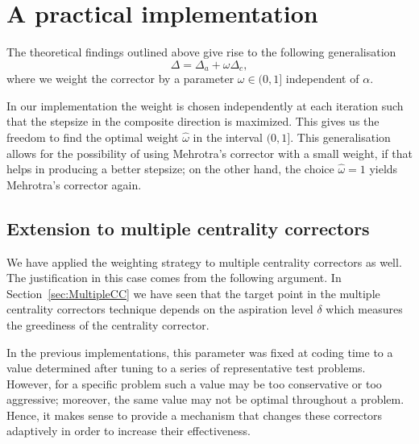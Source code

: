 

%
%
\section{A practical implementation}

The theoretical findings 
outlined above give rise to the following generalisation
\[
\Delta = \Delta_{a} +\omega\Delta_c,
\]
where we weight the corrector by a parameter $\omega\in(0,1]$ 
independent of $\alpha$.

In our implementation the weight is chosen independently at each 
iteration such that the stepsize in the composite direction 
is maximized. This gives us the freedom to find the optimal weight 
$\hat\omega$ in the interval $(0,1]$. 
%
This generalisation allows for the possibility of using Mehrotra's 
corrector with a small weight, if that helps in producing a better
stepsize; on the other hand, 
the choice $\hat\omega=1$ yields Mehrotra's corrector again. 


%
%
\subsection{Extension to multiple centrality correctors}

We have applied the weighting strategy to multiple centrality correctors 
as well. The justification in this case comes from the following argument.
In Section~\ref{sec:MultipleCC} we have seen that the target point 
in the multiple centrality correctors technique depends on the
aspiration level
$\delta$ which measures the greediness of the centrality corrector. 

In the previous implementations, this parameter was fixed at coding time 
to a value determined after tuning to a series of representative 
test problems. However, for a specific problem such a value may be 
too conservative or too aggressive; moreover, the same value may not 
be optimal throughout a problem. Hence, it makes sense to provide 
a mechanism that changes these correctors adaptively in order 
to increase their effectiveness.

